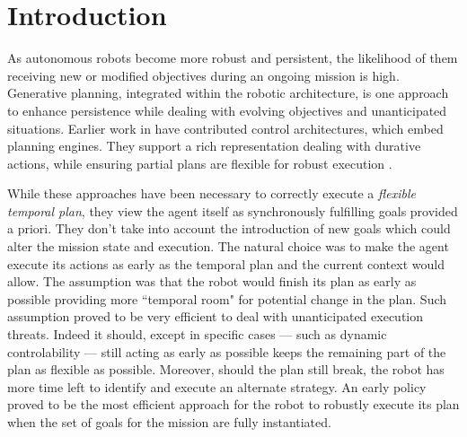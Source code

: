 \section{Introduction}
\label{sec:intro}

As autonomous robots become more robust and persistent, the likelihood
of them receiving new or modified objectives during an ongoing mission
is high. Generative planning, integrated within the robotic
architecture, is one approach to enhance persistence while dealing
with evolving objectives and unanticipated situations.  Earlier work
in
\cite{AmbrosIngerson88,Haigh98,alami:1998p820,mus98,chien99,mus04,py10}
have contributed control architectures, which embed planning engines.
They support a rich representation dealing with durative actions,
while ensuring partial plans are flexible for robust execution
\cite{lemai-chenevier2004}.


While these approaches have been necessary to correctly execute a
\emph{flexible temporal plan}, they view the agent itself as
synchronously fulfilling goals provided a priori. They don't take into
account the introduction of new goals which could alter the mission
state and execution.
The natural choice was to make the agent execute its actions as early
as the temporal plan and the current context would allow. The
assumption was that the robot would finish its plan as early as
possible providing more ``temporal room" for potential change in the
plan. Such assumption proved to be very efficient to deal with
unanticipated execution threats. Indeed it should, except in specific
cases --- such as dynamic controlability \cite{morris01} --- still
acting as early as possible keeps the remaining part of the plan as
flexible as possible. Moreover, should the plan still break, the robot
has more time left to identify and execute an alternate strategy. An
early policy proved to be the most efficient approach for the robot to
robustly execute its plan when the set of goals for the mission are
fully instantiated.


